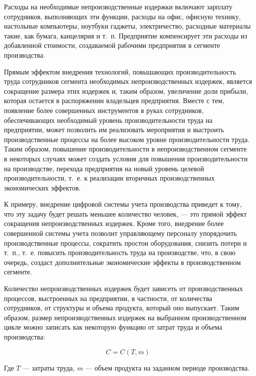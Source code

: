 \documentclass{article}
\begin{document}
Расходы на необходимые непроизводственные издержки включают зарплату сотрудников, выполняющих эти функции, расходы на офис, офисную технику, настольные компьютеры, ноутбуки гаджеты, электричество, расходные материалы такие, как бумага, канцелярия и т.~п. Предприятие компенсирует эти расходы из добавленной стоимости, создаваемой рабочими предприятия в сегменте производства.

Прямым эффектом внедрения технологий, повышающих производительность труда сотрудников сегмента необходимых непроизводственных издержек, является сокращение размера этих издержек и, таким образом, увеличение доли прибыли, которая остается в распоряжении владельцев предприятия. Вместе с тем, появление более совершенных инструментов в руках сотрудников, обеспечивающих необходимый уровень производительности труда на предприятии, может позволить им реализовать мероприятия и выстроить производственные процессы на более высоком уровне производительности труда. Таким образом, повышение производительности в непроизводственном сегменте в некоторых случаях может создать условия для повышения производительности на производстве, перехода предприятия на новый уровень целевой производительности, т.~е. к реализации вторичных производственных экономических эффектов.

К примеру, внедрение цифровой системы учета производства приведет к тому, что эту задачу будет решать меньшее количество человек, — это прямой эффект сокращения непроизводственных издержек. Кроме того, внедрение более совершенной системы учета позволит управляющему персоналу упорядочить производственные процессы, сократить простои оборудования, снизить потери и т.~п., т.~е. повысить производительность труда на производстве, что, в свою очередь, создаст дополнительные экономические эффекты в производственном сегменте.

Количество непроизводственных издержек будет зависеть от производственных процессов, выстроенных на предприятии, в частности, от количества сотрудников, от структуры и объема продукта, который оно выпускает. Таким образом, размер непроизводственных издержек на выбранном производственном цикле можно записать как некоторую функцию от затрат труда и объема производства:

$$C = C(T, m)$$

Где $T$ — затраты труда, $m$ — объем продукта на заданном периоде производства.
\end{document}
